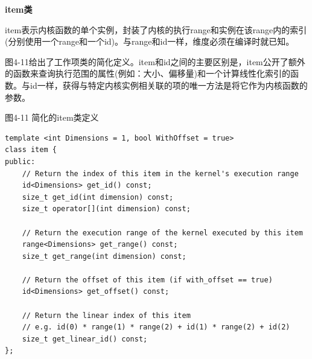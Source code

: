 \hspace*{\fill} \par %
\textbf{item类}

item表示内核函数的单个实例，封装了内核的执行range和实例在该range内的索引(分别使用一个range和一个id)。与range和id一样，维度必须在编译时就已知。\par

图4-11给出了工作项类的简化定义。item和id之间的主要区别是，item公开了额外的函数来查询执行范围的属性(例如：大小、偏移量)和一个计算线性化索引的函数。与id一样，获得与特定内核实例相关联的项的唯一方法是将它作为内核函数的参数。\par

\hspace*{\fill} \par %
图4-11 简化的item类定义
\begin{lstlisting}[caption={}]
template <int Dimensions = 1, bool WithOffset = true>
class item {
public:
	// Return the index of this item in the kernel's execution range
	id<Dimensions> get_id() const;
	size_t get_id(int dimension) const;
	size_t operator[](int dimension) const;
	
	// Return the execution range of the kernel executed by this item
	range<Dimensions> get_range() const;
	size_t get_range(int dimension) const;
	
	// Return the offset of this item (if with_offset == true)
	id<Dimensions> get_offset() const;
	
	// Return the linear index of this item
	// e.g. id(0) * range(1) * range(2) + id(1) * range(2) + id(2)
	size_t get_linear_id() const;
};
\end{lstlisting}










